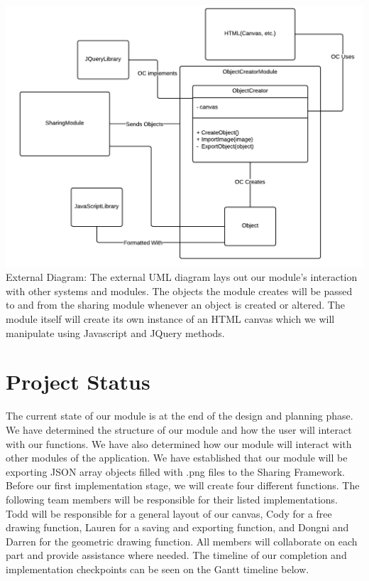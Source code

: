 \documentclass[a4paper, 11pt]{article} %
\begin{document}
\includegraphics[scale=0.52]{ExternalFlowChart}\\
External Diagram: The external UML diagram lays out our module's interaction with other systems and modules. The objects the module creates will be passed to and from the sharing module whenever an object is created or altered. The module itself will create its own instance of an HTML canvas which we will manipulate using Javascript and JQuery methods.


\section*{Project Status}

The current state of our module is at the end of the design and planning phase. We have determined the structure of our module and how the user will interact with our functions. We have also determined how our module will interact with other modules of the application. We have established that our module will be exporting JSON array objects filled with .png files to the Sharing Framework. Before our first implementation stage, we will create four different functions. The following team members will be responsible for their listed implementations. Todd will be responsible for a general layout of our canvas, Cody for a free drawing function, Lauren for a saving and exporting function, and Dongni and Darren for the geometric drawing function. All members will collaborate on each part and provide assistance where needed. The timeline of our completion and implementation checkpoints can be seen on the Gantt timeline below.
\end{document}
